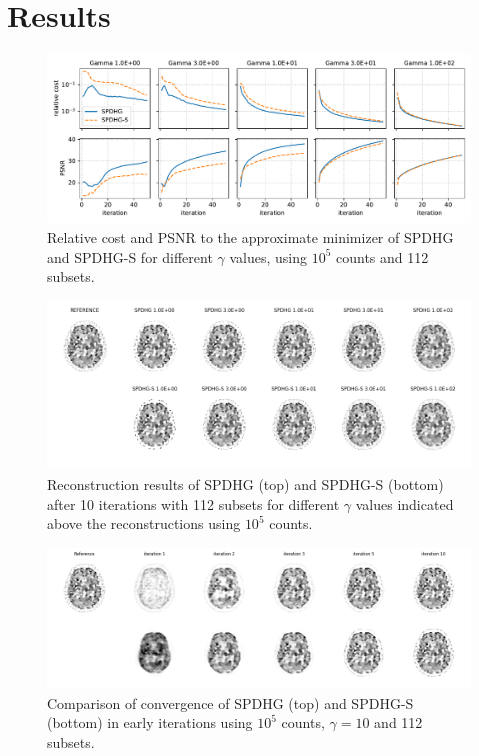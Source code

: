 \documentclass[11pt,twocolumn,twoside]{article}
\begin{document}


\section{Results}

\begin{figure}
  \centering
  \includegraphics[width=1.0\textwidth]{./figs/brain2d_counts_1_0E+05_beta_6_0E-01_niter_5000_50_nsub_112_metrics.pdf}
  \caption{Relative cost and PSNR to the approximate minimizer of SPDHG and SPDHG-S for different
           $\gamma$ values, using $10^5$ counts and 112 subsets.}
  \label{fig:metrics}
\end{figure}

\begin{figure}
  \centering
  \includegraphics[width=1.0\textwidth]{./figs/brain2d_counts_1_0E+05_beta_6_0E-01_niter_5000_50_nsub_112.png}
  \caption{Reconstruction results of SPDHG (top) and SPDHG-S (bottom) after 10 iterations with
           112 subsets for different $\gamma$ values indicated above the reconstructions 
           using $10^5$ counts.}
  \label{fig:gamma}
\end{figure}

\begin{figure}
  \centering
  \includegraphics[width=1.0\textwidth]{./figs/brain2d_counts_1_0E+05_beta_6_0E-01_niter_5000_50_nsub_112_early_iterations.png}
  \caption{Comparison of convergence of SPDHG (top) and SPDHG-S (bottom) in early iterations 
           using $10^5$ counts, $\gamma = 10$ and 112 subsets.}
  \label{fig:early}
\end{figure}
\end{document}
